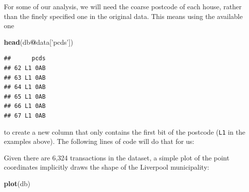 \documentclass[
]{book}
\newenvironment{Shaded}{\begin{snugshade}}{\end{snugshade}}
\newcommand{\DataTypeTok}[1]{\textcolor[rgb]{0.13,0.29,0.53}{#1}}
\newcommand{\DecValTok}[1]{\textcolor[rgb]{0.00,0.00,0.81}{#1}}
\newcommand{\KeywordTok}[1]{\textcolor[rgb]{0.13,0.29,0.53}{\textbf{#1}}}
\newcommand{\NormalTok}[1]{#1}
\newcommand{\OperatorTok}[1]{\textcolor[rgb]{0.81,0.36,0.00}{\textbf{#1}}}
\newcommand{\StringTok}[1]{\textcolor[rgb]{0.31,0.60,0.02}{#1}}
\begin{document}
\begin{Shaded}
\end{Shaded}

For some of our analysis, we will need the coarse postcode of each house, rather than the finely specified one in the original data. This means using the available one

\begin{Shaded}
\begin{Highlighting}[]
\KeywordTok{head}\NormalTok{(db}\OperatorTok{@}\NormalTok{data[}\StringTok{'pcds'}\NormalTok{])}
\end{Highlighting}
\end{Shaded}

\begin{verbatim}
##      pcds
## 62 L1 0AB
## 63 L1 0AB
## 64 L1 0AB
## 65 L1 0AB
## 66 L1 0AB
## 67 L1 0AB
\end{verbatim}

to create a new column that only contains the first bit of the postcode (\texttt{L1} in the examples above). The following lines of code will do that for us:

\begin{Shaded}
\begin{Highlighting}[]
\NormalTok{db}\OperatorTok{$}\NormalTok{pc <-}\StringTok{ }\KeywordTok{as.character}\NormalTok{(}\KeywordTok{lapply}\NormalTok{(}\KeywordTok{strsplit}\NormalTok{(}\KeywordTok{as.character}\NormalTok{(db}\OperatorTok{$}\NormalTok{pcds), }\DataTypeTok{split=}\StringTok{" "}\NormalTok{), }\StringTok{"["}\NormalTok{, }\DecValTok{1}\NormalTok{))}
\end{Highlighting}
\end{Shaded}

Given there are 6,324 transactions in the dataset, a simple plot of the point coordinates implicitly draws the shape of the Liverpool municipality:

\begin{Shaded}
\begin{Highlighting}[]
\KeywordTok{plot}\NormalTok{(db)}
\end{Highlighting}
\end{Shaded}
\end{document}

